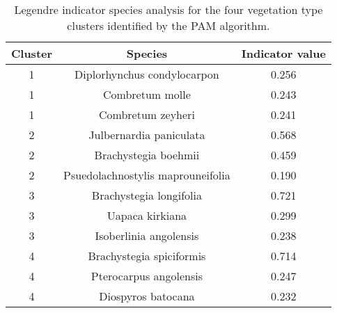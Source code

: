 \begin{table}[ht]
\centering
\begin{tabular}{ccc}
  \hline
Cluster & Species & Indicator value \\ 
  \hline
1 & Diplorhynchus condylocarpon & 0.256 \\ 
  1 & Combretum molle & 0.243 \\ 
  1 & Combretum zeyheri & 0.241 \\ 
  2 & Julbernardia paniculata & 0.568 \\ 
  2 & Brachystegia boehmii & 0.459 \\ 
  2 & Psuedolachnostylis maprouneifolia & 0.190 \\ 
  3 & Brachystegia longifolia & 0.721 \\ 
  3 & Uapaca kirkiana & 0.299 \\ 
  3 & Isoberlinia angolensis & 0.238 \\ 
  4 & Brachystegia spiciformis & 0.714 \\ 
  4 & Pterocarpus angolensis & 0.247 \\ 
  4 & Diospyros batocana & 0.232 \\ 
   \hline
\end{tabular}
\caption{Legendre indicator species analysis for the four vegetation type clusters identified by the PAM algorithm.} 
\label{indval}
\end{table}

